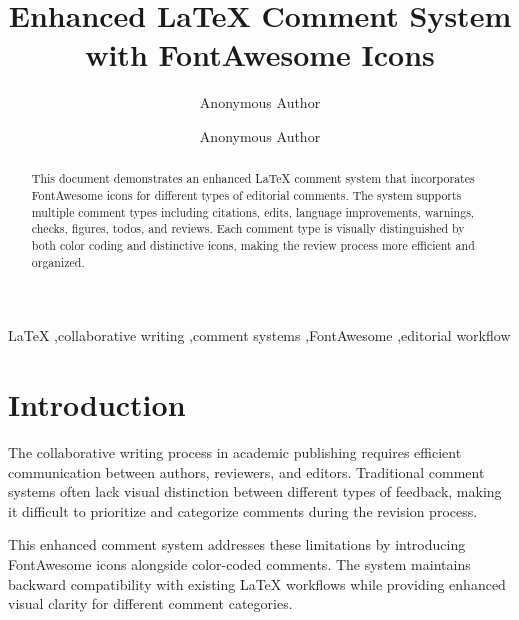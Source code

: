 \documentclass[review]{elsarticle}
\begin{document}
\begin{frontmatter}

\title{Enhanced LaTeX Comment System with FontAwesome Icons}

\author[label1]{Anonymous Author}

\author[label2]{Anonymous Author}


\address[label1]{Department of Computer Science, Anonymous University, Country}
\address[label2]{Anonymous Research Institute, Country}

\begin{abstract}
This document demonstrates an enhanced LaTeX comment system that incorporates FontAwesome icons for different types of editorial comments. The system supports multiple comment types including citations, edits, language improvements, warnings, checks, figures, todos, and reviews. Each comment type is visually distinguished by both color coding and distinctive icons, making the review process more efficient and organized.
\end{abstract}

\begin{keyword}
LaTeX \sep collaborative writing \sep comment systems \sep FontAwesome \sep editorial workflow
\end{keyword}

\end{frontmatter}

\section{Introduction}

The collaborative writing process in academic publishing requires efficient communication between authors, reviewers, and editors. Traditional comment systems often lack visual distinction between different types of feedback, making it difficult to prioritize and categorize comments during the revision process.


This enhanced comment system addresses these limitations by introducing FontAwesome icons alongside color-coded comments. The system maintains backward compatibility with existing LaTeX workflows while providing enhanced visual clarity for different comment categories.
\end{document}
